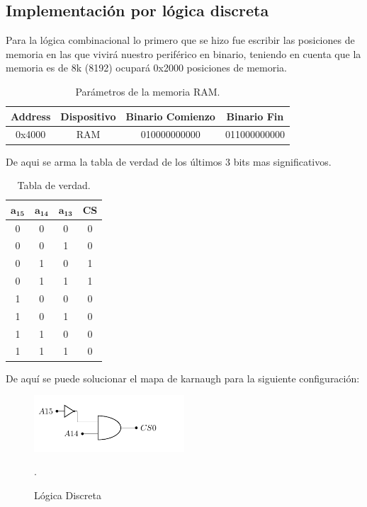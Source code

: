 \subsection{Implementación por lógica discreta}
Para la lógica combinacional lo primero que se hizo fue escribir las posiciones de memoria en las que vivirá nuestro periférico en binario, teniendo en cuenta que la memoria es de 8k (8192) ocupará 0x2000 posiciones de memoria.
\begin{table}[H]
\centering
\begin{tabular}{cccc}
\hline
\textbf{Address} & \textbf{Dispositivo} & \textbf{Binario Comienzo} & \textbf{Binario Fin} \\ \hline
0x4000 & RAM & 010000000000 & 011000000000 \\ \hline
\end{tabular}
\caption{Parámetros de la memoria RAM.}
\end{table}
De aqui se arma la tabla de verdad de los últimos 3 bits mas significativos.
\begin{table}[H]
\centering
\begin{tabular}{cccc}
\hline
$\mathbf{a_{15}}$ & $\mathbf{a_{14}}$ & $\mathbf{a_{13}}$ & \textbf{CS} \\ \hline
0 & 0 & 0 & 0 \\
0 & 0 & 1 & 0 \\
0 & 1 & 0 & 1 \\
0 & 1 & 1 & 1 \\
1 & 0 & 0 & 0 \\
1 & 0 & 1 & 0 \\
1 & 1 & 0 & 0 \\
1 & 1 & 1 & 0	\\ \hline
\end{tabular}
\caption{Tabla de verdad.}
\label{tab:truetab}

\end{table}
De aquí se puede solucionar el mapa de karnaugh para la siguiente configuración:
\begin{figure}[H]
  \centering
  \includegraphics[width=0.5\textwidth,page = 1]{ImagenesEjercicio1/Circuits.pdf}
  \caption{Lógica Discreta}.
  \label{fig:circLog}
\end{figure}
